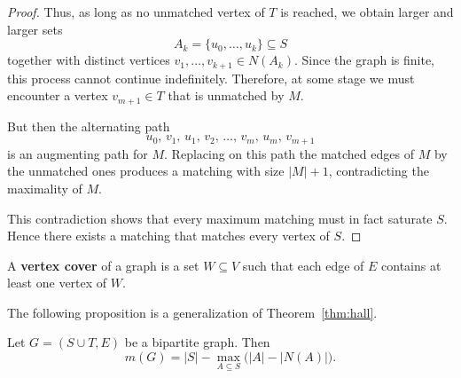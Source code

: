 \documentclass[11pt, a4paper]{ctexrep}
\begin{document}
\begin{proof}
    \medskip

    Thus, as long as no unmatched vertex of $T$ is reached, we obtain larger and
    larger sets
    \[
        A_k=\{u_0,\dots,u_k\}\subseteq S
    \]
    together with distinct vertices $v_1,\dots,v_{k+1}\in N(A_k)$.
    Since the graph is finite, this process cannot continue indefinitely. Therefore,
    at some stage we must encounter a vertex $v_{m+1}\in T$ that is unmatched by
    $M$.

    But then the alternating path
    \[
        u_0,\, v_1,\, u_1,\, v_2,\, \dots,\, v_m,\, u_m,\, v_{m+1}
    \]
    is an augmenting path for $M$. Replacing on this path the matched edges of $M$
    by the unmatched ones produces a matching with size $|M|+1$, contradicting
    the maximality of $M$.

    This contradiction shows that every maximum matching must in fact saturate $S$.
    Hence there exists a matching that matches every vertex of $S$.
\end{proof}

\begin{definition}
    A \textbf{vertex cover} of a graph is a set $W\subseteq V$ such that each edge of $E$ contains at least one vertex of $W$.
\end{definition}

The following proposition is a generalization of Theorem~\ref{thm:hall}.

\begin{proposition}\label{prop:deficiency}
    Let $G=(S\cup T,E)$ be a bipartite graph. Then
    \[
        m(G)=|S|-\max_{A\subseteq S}\bigl(|A|-|N(A)|\bigr).
    \]
\end{proposition}
\end{document}
